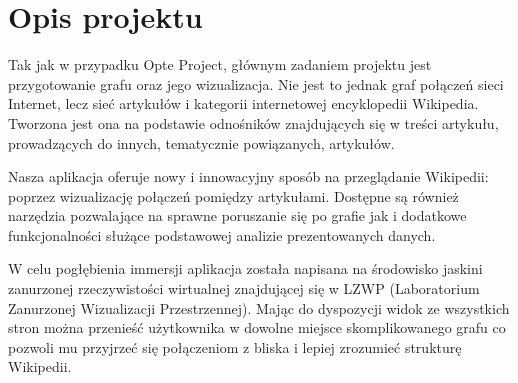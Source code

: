 \section{Opis projektu}
Tak jak w przypadku Opte Project, głównym zadaniem projektu jest przygotowanie grafu oraz jego wizualizacja. Nie jest to jednak graf połączeń sieci Internet, lecz sieć artykułów i kategorii internetowej encyklopedii Wikipedia. Tworzona jest ona na podstawie odnośników znajdujących się w treści artykułu, prowadzących do innych, tematycznie powiązanych, artykułów.

Nasza aplikacja oferuje nowy i innowacyjny sposób na przeglądanie Wikipedii: poprzez wizualizację połączeń pomiędzy artykułami. Dostępne są również narzędzia pozwalające na sprawne poruszanie się po grafie jak i dodatkowe funkcjonalności służące podstawowej analizie prezentowanych danych.

W celu pogłębienia immersji aplikacja została napisana na środowisko jaskini zanurzonej rzeczywistości wirtualnej znajdującej się w LZWP (Laboratorium Zanurzonej Wizualizacji Przestrzennej). Mając do dyspozycji widok ze wszystkich stron można przenieść użytkownika w dowolne miejsce skomplikowanego grafu co pozwoli mu przyjrzeć się połączeniom z bliska i lepiej zrozumieć strukturę Wikipedii.
